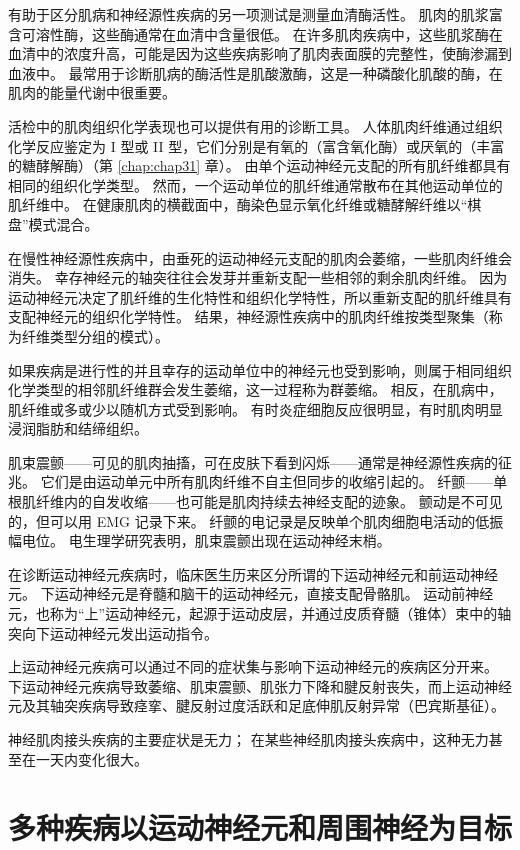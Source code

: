 有助于区分肌病和神经源性疾病的另一项测试是测量血清酶活性。
肌肉的肌浆富含可溶性酶，这些酶通常在血清中含量很低。
在许多肌肉疾病中，这些肌浆酶在血清中的浓度升高，可能是因为这些疾病影响了肌肉表面膜的完整性，使酶渗漏到血液中。
最常用于诊断肌病的酶活性是肌酸激酶，这是一种磷酸化肌酸的酶，在肌肉的能量代谢中很重要。


活检中的肌肉组织化学表现也可以提供有用的诊断工具。
人体肌肉纤维通过组织化学反应鉴定为 I 型或 II 型，它们分别是有氧的（富含氧化酶）或厌氧的（丰富的糖酵解酶）（第 \ref{chap:chap31} 章）。
由单个运动神经元支配的所有肌纤维都具有相同的组织化学类型。
然而，一个运动单位的肌纤维通常散布在其他运动单位的肌纤维中。
在健康肌肉的横截面中，酶染色显示氧化纤维或糖酵解纤维以“棋盘”模式混合。


在慢性神经源性疾病中，由垂死的运动神经元支配的肌肉会萎缩，一些肌肉纤维会消失。
幸存神经元的轴突往往会发芽并重新支配一些相邻的剩余肌肉纤维。
因为运动神经元决定了肌纤维的生化特性和组织化学特性，所以重新支配的肌纤维具有支配神经元的组织化学特性。
结果，神经源性疾病中的肌肉纤维按类型聚集（称为纤维类型分组的模式）。


如果疾病是进行性的并且幸存的运动单位中的神经元也受到影响，则属于相同组织化学类型的相邻肌纤维群会发生萎缩，这一过程称为群萎缩。
相反，在肌病中，肌纤维或多或少以随机方式受到影响。
有时炎症细胞反应很明显，有时肌肉明显浸润脂肪和结缔组织。


肌束震颤——可见的肌肉抽搐，可在皮肤下看到闪烁——通常是神经源性疾病的征兆。
它们是由运动单元中所有肌肉纤维不自主但同步的收缩引起的。
纤颤——单根肌纤维内的自发收缩——也可能是肌肉持续去神经支配的迹象。
颤动是不可见的，但可以用 EMG 记录下来。
纤颤的电记录是反映单个肌肉细胞电活动的低振幅电位。
电生理学研究表明，肌束震颤出现在运动神经末梢。


在诊断运动神经元疾病时，临床医生历来区分所谓的下运动神经元和前运动神经元。
下运动神经元是脊髓和脑干的运动神经元，直接支配骨骼肌。
运动前神经元，也称为“上”运动神经元，起源于运动皮层，并通过皮质脊髓（锥体）束中的轴突向下运动神经元发出运动指令。


上运动神经元疾病可以通过不同的症状集与影响下运动神经元的疾病区分开来。
下运动神经元疾病导致萎缩、肌束震颤、肌张力下降和腱反射丧失，而上运动神经元及其轴突疾病导致痉挛、腱反射过度活跃和足底伸肌反射异常（巴宾斯基征）。


神经肌肉接头疾病的主要症状是无力；
在某些神经肌肉接头疾病中，这种无力甚至在一天内变化很大。



\section{多种疾病以运动神经元和周围神经为目标}

